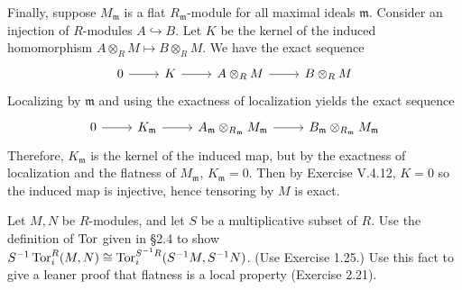 \documentclass[../../master.tex]{subfiles}
\begin{document}
\begin{solution}
    Finally, suppose $M_{\mathfrak{m}}$ is a flat $R_{\mathfrak{m}}$-module for all maximal ideals $\mathfrak{m}$.
    Consider an injection of $R$-modules $A \hookrightarrow B$.
    Let $K$ be the kernel of the induced homomorphism $A \otimes_R M \mapsto B \otimes_R M$.
    We have the exact sequence
    \[
    \begin{tikzcd}
        0 & K & A \otimes_R M & B \otimes_R M
        \arrow[from=1-1, to=1-2]
        \arrow[from=1-2, to=1-3]
        \arrow[from=1-3, to=1-4] 
    \end{tikzcd}
    \]
    Localizing by $\mathfrak{m}$ and using the exactness of localization yields the exact sequence
    \[
    \begin{tikzcd}
        0 & K_{\mathfrak{m}} & A_{\mathfrak{m}} \otimes_{R_{\mathfrak{m}}} M_{\mathfrak{m}} & B_{\mathfrak{m}} \otimes_{R_{\mathfrak{m}}} M_{\mathfrak{m}}
        \arrow[from=1-1, to=1-2]
        \arrow[from=1-2, to=1-3]
        \arrow[from=1-3, to=1-4] 
    \end{tikzcd}
    \]
    Therefore, $K_{\mathfrak{m}}$ is the kernel of the induced map, but by the exactness of localization and the flatness of $M_{\mathfrak{m}}$, $K_{\mathfrak{m}} = 0$.
    Then by Exercise V.4.12, $K = 0$ so the induced map is injective, hence tensoring by $M$ is exact.
\end{solution}

\begin{problem}
    Let $M, N$ be $R$-modules, and let $S$ be a multiplicative subset of $R$.
    Use the definition of $\operatorname{Tor}$ given in \S 2.4 to show $S^{-1}\operatorname{Tor}_i^{R}(M, N) \cong \operatorname{Tor}_i^{S^{-1}R}(S^{-1}M, S^{-1}N)$.
    (Use Exercise 1.25.)
    Use this fact to give a leaner proof that flatness is a local property (Exercise 2.21).
\end{problem}
\end{document}
